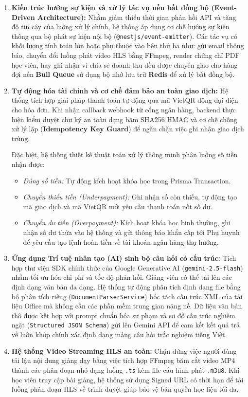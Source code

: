 \documentclass[../main.tex]{subfiles}
\begin{document}
\begin{enumerate}
    \item \textbf{Kiến trúc hướng sự kiện và xử lý tác vụ nền bất đồng bộ (Event-Driven Architecture):}
    Nhằm giảm thiểu thời gian phản hồi API và tăng độ tin cậy của luồng xử lý chính, hệ thống áp dụng cơ chế hướng sự kiện thông qua bộ phát sự kiện nội bộ (\texttt{@nestjs/event-emitter}). Các tác vụ có khối lượng tính toán lớn hoặc phụ thuộc vào bên thứ ba như: gửi email thông báo, chuyển đổi luồng phát video HLS bằng FFmpeg, render chứng chỉ PDF học viên, hay ghi nhận ví chia sẻ doanh thu đều được chuyển giao cho hàng đợi nền \textbf{Bull Queue} sử dụng bộ nhớ lưu trữ \textbf{Redis} để xử lý bất đồng bộ.
    
    \item \textbf{Tự động hóa tài chính và cơ chế đảm bảo an toàn giao dịch:}
    Hệ thống tích hợp giải pháp thanh toán tự động qua mã VietQR động đại diện cho hóa đơn. Khi nhận callback webhook từ cổng ngân hàng, backend thực hiện kiểm duyệt chữ ký an toàn dạng băm SHA256 HMAC và cơ chế chống xử lý lặp (\textbf{Idempotency Key Guard}) để ngăn chặn việc ghi nhận giao dịch trùng.
    
    Đặc biệt, hệ thống thiết kế thuật toán xử lý thông minh phân luồng số tiền nhận được:
    \begin{itemize}
        \item \emph{Đúng số tiền:} Tự động kích hoạt khóa học trong Prisma Transaction.
        \item \emph{Chuyển thiếu tiền (Underpayment):} Ghi nhận số còn thiếu, tự động tạo mã giao dịch và mã VietQR mới yêu cầu thanh toán nốt số dư.
        \item \emph{Chuyển dư tiền (Overpayment):} Kích hoạt khóa học bình thường, ghi nhận số dư thừa vào hệ thống và gửi thông báo khẩn cấp tới Phụ huynh để yêu cầu tạo lệnh hoàn tiền về tài khoản ngân hàng thụ hưởng.
    \end{itemize}

    \item \textbf{Ứng dụng Trí tuệ nhân tạo (AI) sinh bộ câu hỏi có cấu trúc:}
    Tích hợp thư viện SDK chính thức của Google Generative AI (\texttt{gemini-2.5-flash}) nhằm tối ưu hóa chi phí và tốc độ phản hồi. Giảng viên có thể tải lên các định dạng văn bản đa dạng. Hệ thống tự động phân tích định dạng file bằng bộ phân tích riêng (\texttt{DocumentParserService}) bóc tách cấu trúc XML của tài liệu Office mà không cần các phần mềm trung gian nặng nề. Dữ liệu văn bản thô được kết hợp với prompt chuẩn hóa sư phạm và sơ đồ cấu trúc nghiêm ngặt (\texttt{Structured JSON Schema}) gửi lên Gemini API để cam kết kết quả trả về luôn khớp chính xác định dạng mảng câu hỏi trắc nghiệm tiếng Việt.

    \item \textbf{Hệ thống Video Streaming HLS an toàn:}
    Chặn đứng việc người dùng tải lậu nội dung giảng dạy bằng việc tích hợp FFmpeg băm cắt video MP4 thành các phân đoạn nhỏ dạng luồng \texttt{.ts} kèm file cấu hình phát \texttt{.m3u8}. Khi học viên truy cập bài giảng, hệ thống sử dụng Signed URL có thời hạn để tải luồng phân đoạn HLS về trình duyệt giúp bảo vệ bản quyền học liệu tối đa.
\end{enumerate}
\end{document}

